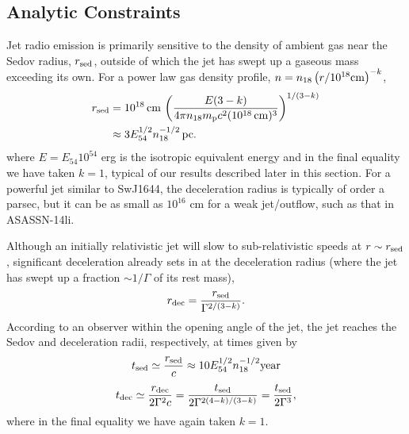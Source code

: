 \documentclass[usenatbib,fleqn]{mnras}
\begin{document}

\subsection{Analytic Constraints}
\label{sec:analy}


Jet radio emission is primarily sensitive to the density of ambient
gas near the Sedov radius, $r_{\rm sed}$, outside of which the jet has
swept up a gaseous mass exceeding its own. For a power law gas density
profile, $n= n_{18} \left(r/10^{18} {\rm cm}\right)^{-k}$,
\begin{align}
  r_{\rm sed} &= 10^{18} \,{\rm cm}\, \left( \frac{E(3-k)}{4\pi n_{18}
      m_{\rm p} c^2 (10^{18}\,{\rm cm})^3} \right)^{1/(3-k)}  \nonumber\\
  &\approx 3 E_{54}^{1/2} n_{\rm 18}^{-1/2}\,{\rm pc}.
  \label{eq:rdec}
\end{align}
where $E = E_{54}10^{54}$ erg is the isotropic equivalent energy and
in the final equality we have taken $k = 1$, typical of our results
described later in this section.  For a powerful jet similar to
SwJ1644, the deceleration radius is typically of order a parsec, but
it can be as small as $10^{16}$ cm for a weak jet/outflow, such as
that in ASASSN-14li.

Although an initially relativistic jet will slow to sub-relativistic
speeds at $r \sim r_{\rm sed}$, significant deceleration already sets
in at the deceleration radius (where the jet has swept up a
fraction $\sim 1/\Gamma$ of its rest mass),
\begin{equation}
  r_{\rm dec}=\frac{r_{\rm sed}}{\Gamma^{2/(3-k)}}.
  \label{eq:rdec2}
\end{equation}
According to an observer within the opening angle of the jet, the jet
reaches the Sedov and deceleration radii, respectively, at times given
by
\begin{equation}
t_{\rm sed} \simeq \frac{r_{\rm sed}}{c} \approx
10 E_{54}^{1/2}n_{18}^{-1/2} {\rm year}
 \end{equation} 
\begin{equation}
t_{\rm dec} \simeq
\frac{r_{\rm dec}}{2\Gamma^{2} c} = \frac{t_{\rm
    sed}}{2\Gamma^{2(4-k)/(3-k)}} = \frac{t_{\rm sed}}{2\Gamma^{3}},
 \label{eq:tdec}
\end{equation}
%
where in the final equality we have again taken $k = 1$.
\end{document}
